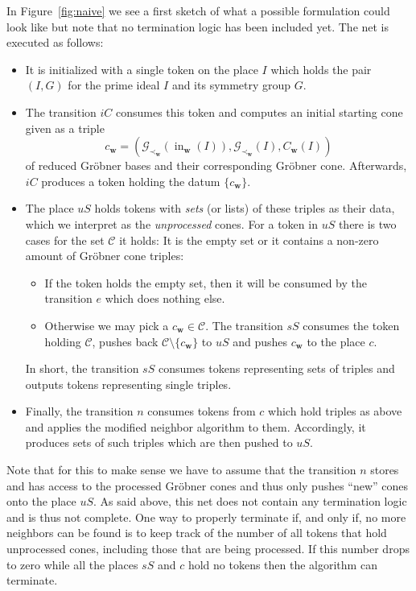 \documentclass[
  paper=a4,
  titlepage,
  bibliography=totoc,
  pagesize=pdftex
]{scrartcl}
\numberwithin{figure}{section}
\numberwithin{equation}{section}
\numberwithin{table}{section}
\let\vec\mathbf
\DeclareMathOperator{\initial}{in}
\theoremstyle{definition}
\numberwithin{definition}{section}
\begin{document}
In Figure~\ref{fig:naive} we see a first sketch of what a possible formulation could look
like but note that no termination logic has been included yet. The net is executed as
follows:
\begin{itemize}
  \item It is initialized with a single token on the place $I$ which holds the pair $(I,
    G)$ for the prime ideal $I$ and its symmetry group $G$.
  \item The transition $iC$ consumes this token and computes an initial starting cone
    given as a triple
    \[
      c_{\vec w} = (
        \mathcal G_{\prec_{\vec w}}(\initial_{\vec w}(I)),
        \mathcal G_{\prec_{\vec w}}(I),
        C_{\vec w}(I)
      )
    \]
    of reduced Gröbner bases and their corresponding Gröbner cone. Afterwards, $iC$
    produces a token holding the datum $\{c_{\vec w}\}$.
  \item The place $uS$ holds tokens with \emph{sets} (or lists) of these triples as their
    data, which we interpret as the \emph{unprocessed} cones. For a token in $uS$ there is
    two cases for the set $\mathcal C$ it holds: It is the empty set or it contains a
    non-zero amount of Gröbner cone triples:
    \begin{itemize}
      \item If the token holds the empty set, then it will be consumed by the transition
        $e$ which does nothing else.
      \item Otherwise we may pick a $c_{\vec w} \in \mathcal C$. The transition $sS$
        consumes the token holding $\mathcal C$, pushes back $\mathcal C\setminus \{
        c_{\vec w}\}$ to $uS$ and pushes $c_{\vec w}$ to the place $c$.
    \end{itemize}
    In short, the transition $sS$ consumes tokens representing sets of triples and outputs
    tokens representing single triples.
  \item Finally, the transition $n$ consumes tokens from $c$ which hold triples as above
    and applies the modified neighbor algorithm to them. Accordingly, it produces sets of
    such triples which are then pushed to $uS$.
\end{itemize}
Note that for this to make sense we have to assume that the transition $n$ stores and has
access to the processed Gröbner cones and thus only pushes \enquote{new} cones onto the
place $uS$. As said above, this net does not contain any termination logic and is thus not
complete. One way to properly terminate if, and only if, no more neighbors can be found is
to keep track of the number of all tokens that hold unprocessed cones, including those
that are being processed. If this number drops to zero while all the places $sS$ and $c$
hold no tokens then the algorithm can terminate.
\end{document}

